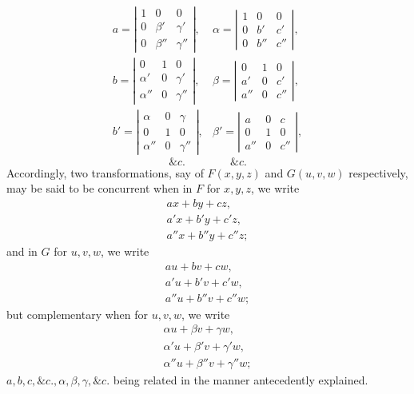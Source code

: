 \documentclass[11pt]{article}
\newcommand{\sourcepage}[1]{\marginpar{\scriptsize p.~#1}}
\begin{document}
{{\sourcepage{199}
\[
\begin{array}{ll}
a=\left|\begin{array}{ccc}1&0&0\\0&\beta'&\gamma'\\0&\beta''&\gamma''\end{array}\right|,
&
\alpha=\left|\begin{array}{ccc}1&0&0\\0&b'&c'\\0&b''&c''\end{array}\right|,\\[2.0em]
b=\left|\begin{array}{ccc}0&1&0\\\alpha'&0&\gamma'\\\alpha''&0&\gamma''\end{array}\right|,
&
\beta=\left|\begin{array}{ccc}0&1&0\\a'&0&c'\\a''&0&c''\end{array}\right|,\\[2.0em]
b'=\left|\begin{array}{ccc}\alpha&0&\gamma\\0&1&0\\\alpha''&0&\gamma''\end{array}\right|,
&
\beta'=\left|\begin{array}{ccc}a&0&c\\0&1&0\\a''&0&c''\end{array}\right|,
\end{array}
\]
\[
 \&c.\qquad\qquad \&c.
\]
Accordingly, two transformations, say of $F(x,y,z)$ and $G(u,v,w)$ respectively, may be said to be concurrent when in $F$ for $x,y,z$, we write
\[
\begin{gathered}
 ax+by+cz,\\
 a'x+b'y+c'z,\\
 a''x+b''y+c''z;
\end{gathered}
\]
and in $G$ for $u,v,w$, we write
\[
\begin{gathered}
 au+bv+cw,\\
 a'u+b'v+c'w,\\
 a''u+b''v+c''w;
\end{gathered}
\]
but complementary when for $u,v,w$, we write
\[
\begin{gathered}
 \alpha u+\beta v+\gamma w,\\
 \alpha'u+\beta'v+\gamma'w,\\
 \alpha''u+\beta''v+\gamma''w;
\end{gathered}
\]
$a,b,c,\&c.,\alpha,\beta,\gamma,\&c.$ being related in the manner antecedently explained.

}}
\end{document}
